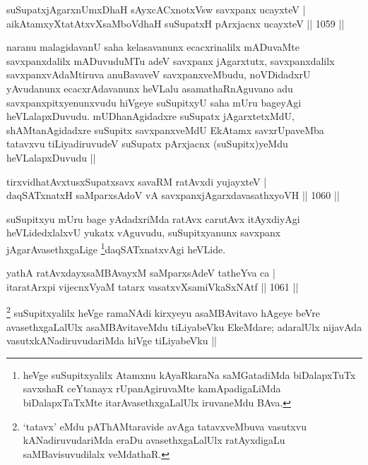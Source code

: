 \begin{shl}
suSupatxjAgarxnUmxDhaH sAyxcACxnotxV\s sw savxpanx ucayxteV | \\
aikAtamxyXtatAtxvXsaMboVdhaH suSupatxH pArxjacnx ucayxteV \hfill||  1059 ||  
\end{shl}

\begin{artha}
naranu malagidavanU saha kelasavanunx ecacxrinalilx mADuvaMte savxpanxdalilx mADuvuduMTu adeV savxpanx jAgarxtutx, savxpanxdalilx savxpanxvAdaMtiruva anuBavaveV savxpanxveMbudu, noVDidadxrU yAvudanunx ecacxrAdavanunx heVLalu asamathaRnAguvano adu savxpanxpitxyenunxvudu hiVgeye suSupitxyU saha mUru bageyAgi heVLalapxDuvudu. mUDhanAgidadxre suSupatx jAgarxtetxMdU, shAMtanAgidadxre suSupitx savxpanxveMdU EkAtamx savxrUpaveMba tatavxvu tiLiyadiruvudeV suSupatx pArxjacnx (suSupitx)yeMdu heVLalapxDuvudu ||
\end{artha}


\begin{shl}
tirxvidhatAvxtusxSupatxsavx savaRM ratAvxdi yujayxteV | \\
daqSATxnatxH saMparxsAdoV vA savxpanxjAgarxdavasathxyoVH \hfill||  1060 ||  
\end{shl}

\begin{artha}
suSupitxyu mUru bage yAdadxriMda ratAvx carutAvx itAyxdiyAgi heVLidedxlalxvU yukatx vAguvudu, suSupitxyanunx savxpanx jAgarAvasethxgaLige \footnote{heVge suSupitxyalilx Atamxnu kAyaRkaraNa saMGatadiMda biDalapxTuTx savxshaR ceYtanayx rUpanAgiruvaMte kamApadigaLiMda biDalapxTaTxMte itarAvasethxgaLalUlx iruvaneMdu BAva.}daqSATxnatxvAgi heVLide.
\end{artha}


\begin{shl}
yathA ratAvxdayxsaMBAvayxM saMparxsAdeV tatheYva ca | \\
itaratArxpi vijecnxVyaM tatarx vasatxvXsamiVkaSxNAtf \hfill||  1061 ||  
\end{shl}

\begin{artha}
\footnote{`tatavx' eMdu pAThAMtaravide avAga tatavxveMbuva vasutxvu kANadiruvudariMda eraDu avasethxgaLalUlx ratAyxdigaLu saMBavisuvudilalx veMdathaR.}
suSupitxyalilx heVge ramaNAdi kirxyeyu asaMBAvitavo hAgeye beVre avasethxgaLalUlx asaMBAvitaveMdu tiLiyabeVku EkeMdare; adaralUlx nijavAda vasutxkANadiruvudariMda hiVge tiLiyabeVku ||
\end{artha}

